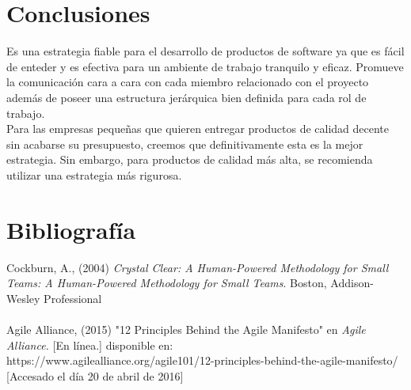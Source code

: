 \documentclass[12pt,a4paper]{article}
\begin{document}
	\section{Conclusiones}
	Es una estrategia fiable para el desarrollo de productos de software ya que es f\'acil de enteder y es efectiva para un ambiente de trabajo tranquilo y eficaz. 
Promueve la comunicaci\'on cara a cara con cada miembro relacionado con el proyecto adem\'as de poseer una estructura jer\'arquica bien definida para cada rol de trabajo.\\
Para las empresas peque\~nas que quieren entregar productos de calidad decente sin acabarse su presupuesto, creemos que definitivamente esta es la mejor estrategia.
Sin embargo, para productos de calidad m\'as alta, se recomienda utilizar una estrategia m\'as rigurosa. 
	
	\section{Bibliografía}
	Cockburn, A., (2004) {\itshape Crystal Clear: A Human-Powered Methodology for Small Teams: A Human-Powered Methodology for Small Teams}. Boston, Addison-Wesley Professional
\\
\\Agile Alliance, (2015) "12 Principles Behind the Agile Manifesto" en {\itshape Agile Alliance.} [En l\'inea.] disponible en:
\\
https://www.agilealliance.org/agile101/12-principles-behind-the-agile-manifesto/
[Accesado el d\'ia 20 de abril de 2016]
\end{document}
